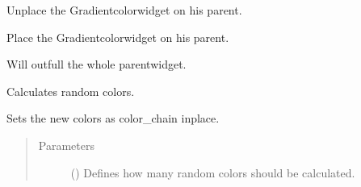 \documentclass[letterpaper,10pt,english]{sphinxmanual}
\begin{document}
\begin{fulllineitems}
\begin{fulllineitems}
\label{\detokenize{anoog.automation:anoog.automation.bg_booster.Color_Gradient_Booster.set_off_screen}}
\sphinxAtStartPar
Unplace the Gradient\sphinxhyphen{}color\sphinxhyphen{}widget on his parent.

\end{fulllineitems}


\begin{fulllineitems}
\label{\detokenize{anoog.automation:anoog.automation.bg_booster.Color_Gradient_Booster.set_on_screen}}
\sphinxAtStartPar
Place the Gradient\sphinxhyphen{}color\sphinxhyphen{}widget on his parent.

\sphinxAtStartPar
Will outfull the whole parent\sphinxhyphen{}widget.

\end{fulllineitems}


\begin{fulllineitems}
\label{\detokenize{anoog.automation:anoog.automation.bg_booster.Color_Gradient_Booster.set_random_colors}}
\sphinxAtStartPar
Calculates random colors.

\sphinxAtStartPar
Sets the new colors as color\_chain inplace.
\begin{quote}\begin{description}
\item[{Parameters}] \leavevmode
\sphinxAtStartPar
{} (\sphinxstyleliteralemphasis{\sphinxupquote{, }}) \textendash{} Defines how many random colors should be calculated.

\end{description}\end{quote}


\end{fulllineitems}
\end{fulllineitems}
\end{document}
